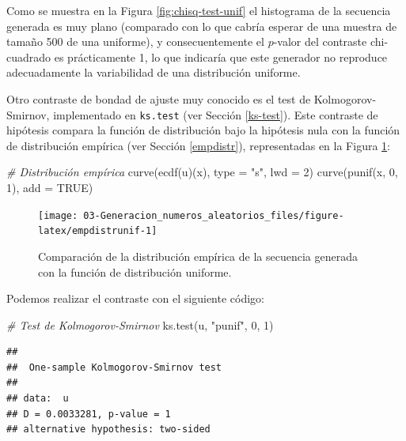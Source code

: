 \documentclass[
]{book}
\newenvironment{Shaded}{\begin{snugshade}}{\end{snugshade}}
\newcommand{\AttributeTok}[1]{\textcolor[rgb]{0.77,0.63,0.00}{#1}}
\newcommand{\CommentTok}[1]{\textcolor[rgb]{0.56,0.35,0.01}{\textit{#1}}}
\newcommand{\ConstantTok}[1]{\textcolor[rgb]{0.00,0.00,0.00}{#1}}
\newcommand{\DecValTok}[1]{\textcolor[rgb]{0.00,0.00,0.81}{#1}}
\newcommand{\FunctionTok}[1]{\textcolor[rgb]{0.00,0.00,0.00}{#1}}
\newcommand{\NormalTok}[1]{#1}
\newcommand{\StringTok}[1]{\textcolor[rgb]{0.31,0.60,0.02}{#1}}
\theoremstyle{break}
\theoremstyle{definition}
\theoremstyle{definition}
\theoremstyle{definition}
\theoremstyle{definition}
\theoremstyle{remark}
\begin{document}
Como se muestra en la Figura \ref{fig:chisq-test-unif} el histograma de la secuencia generada es muy plano (comparado con lo que cabría esperar de una muestra de tamaño 500 de una uniforme), y consecuentemente el \(p\)-valor del contraste chi-cuadrado es prácticamente 1, lo que indicaría que este generador no reproduce adecuadamente la variabilidad de una distribución uniforme.

Otro contraste de bondad de ajuste muy conocido es el test de Kolmogorov-Smirnov, implementado en \texttt{ks.test} (ver Sección \ref{ks-test}).
Este contraste de hipótesis compara la función de distribución bajo la hipótesis nula con la función de distribución empírica (ver Sección \ref{empdistr}), representadas en la Figura \ref{fig:empdistrunif}:

\begin{Shaded}
\begin{Highlighting}[]
\CommentTok{\# Distribución empírica}
\FunctionTok{curve}\NormalTok{(}\FunctionTok{ecdf}\NormalTok{(u)(x), }\AttributeTok{type =} \StringTok{"s"}\NormalTok{, }\AttributeTok{lwd =} \DecValTok{2}\NormalTok{)}
\FunctionTok{curve}\NormalTok{(}\FunctionTok{punif}\NormalTok{(x, }\DecValTok{0}\NormalTok{, }\DecValTok{1}\NormalTok{), }\AttributeTok{add =} \ConstantTok{TRUE}\NormalTok{)}
\end{Highlighting}
\end{Shaded}

\begin{figure}[!htb]

{\centering \texttt{[image: 03-Generacion\_numeros\_aleatorios\_files/figure-latex/empdistrunif-1]} 

}

\caption{Comparación de la distribución empírica de la secuencia generada con la función de distribución uniforme.}\label{fig:empdistrunif}
\end{figure}

Podemos realizar el contraste con el siguiente código:

\begin{Shaded}
\begin{Highlighting}[]
\CommentTok{\# Test de Kolmogorov{-}Smirnov}
\FunctionTok{ks.test}\NormalTok{(u, }\StringTok{"punif"}\NormalTok{, }\DecValTok{0}\NormalTok{, }\DecValTok{1}\NormalTok{)}
\end{Highlighting}
\end{Shaded}

\begin{verbatim}
## 
##  One-sample Kolmogorov-Smirnov test
## 
## data:  u
## D = 0.0033281, p-value = 1
## alternative hypothesis: two-sided
\end{verbatim}
\end{document}
